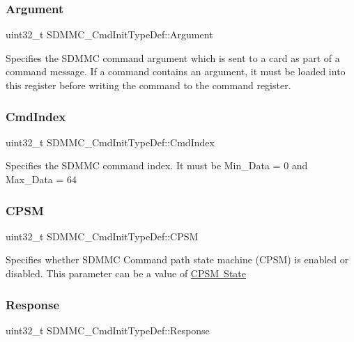 \subsubsection{\texorpdfstring{Argument}{Argument}}
{\footnotesize\ttfamily uint32\+\_\+t S\+D\+M\+M\+C\+\_\+\+Cmd\+Init\+Type\+Def\+::\+Argument}

Specifies the S\+D\+M\+MC command argument which is sent to a card as part of a command message. If a command contains an argument, it must be loaded into this register before writing the command to the command register. \mbox{\label{struct_s_d_m_m_c___cmd_init_type_def_a644b96b2db05401103e4845fcf6be89e}} 
\subsubsection{\texorpdfstring{CmdIndex}{CmdIndex}}
{\footnotesize\ttfamily uint32\+\_\+t S\+D\+M\+M\+C\+\_\+\+Cmd\+Init\+Type\+Def\+::\+Cmd\+Index}

Specifies the S\+D\+M\+MC command index. It must be Min\+\_\+\+Data = 0 and Max\+\_\+\+Data = 64 \mbox{\label{struct_s_d_m_m_c___cmd_init_type_def_a0dfe4dc8a7f873c0e878a2ed12d1df54}} 
\subsubsection{\texorpdfstring{CPSM}{CPSM}}
{\footnotesize\ttfamily uint32\+\_\+t S\+D\+M\+M\+C\+\_\+\+Cmd\+Init\+Type\+Def\+::\+C\+P\+SM}

Specifies whether S\+D\+M\+MC Command path state machine (C\+P\+SM) is enabled or disabled. This parameter can be a value of \mbox{\hyperlink{group___s_d_m_m_c___l_l___c_p_s_m___state}{C\+P\+SM State}} \mbox{\label{struct_s_d_m_m_c___cmd_init_type_def_aee8e8e417ecc5aa3ef8c3926d3521fb6}} 
\subsubsection{\texorpdfstring{Response}{Response}}
{\footnotesize\ttfamily uint32\+\_\+t S\+D\+M\+M\+C\+\_\+\+Cmd\+Init\+Type\+Def\+::\+Response}

